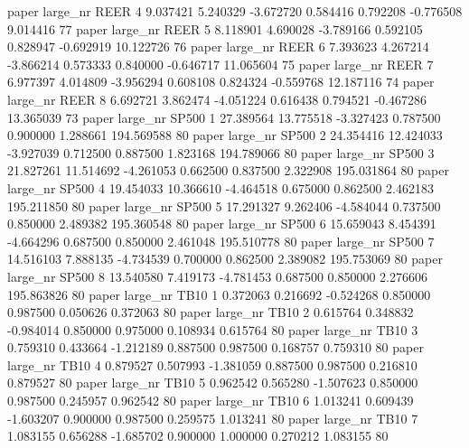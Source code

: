               paper   large_nr     REER                 4  9.037421  5.240329  -3.672720 0.584416 0.792208 -0.776508    9.014416 77
              paper   large_nr     REER                 5  8.118901  4.690028  -3.789166 0.592105 0.828947 -0.692919   10.122726 76
              paper   large_nr     REER                 6  7.393623  4.267214  -3.866214 0.573333 0.840000 -0.646717   11.065604 75
              paper   large_nr     REER                 7  6.977397  4.014809  -3.956294 0.608108 0.824324 -0.559768   12.187116 74
              paper   large_nr     REER                 8  6.692721  3.862474  -4.051224 0.616438 0.794521 -0.467286   13.365039 73
              paper   large_nr    SP500                 1 27.389564 13.775518  -3.327423 0.787500 0.900000  1.288661  194.569588 80
              paper   large_nr    SP500                 2 24.354416 12.424033  -3.927039 0.712500 0.887500  1.823168  194.789066 80
              paper   large_nr    SP500                 3 21.827261 11.514692  -4.261053 0.662500 0.837500  2.322908  195.031864 80
              paper   large_nr    SP500                 4 19.454033 10.366610  -4.464518 0.675000 0.862500  2.462183  195.211850 80
              paper   large_nr    SP500                 5 17.291327  9.262406  -4.584044 0.737500 0.850000  2.489382  195.360548 80
              paper   large_nr    SP500                 6 15.659043  8.454391  -4.664296 0.687500 0.850000  2.461048  195.510778 80
              paper   large_nr    SP500                 7 14.516103  7.888135  -4.734539 0.700000 0.862500  2.389082  195.753069 80
              paper   large_nr    SP500                 8 13.540580  7.419173  -4.781453 0.687500 0.850000  2.276606  195.863826 80
              paper   large_nr     TB10                 1  0.372063  0.216692  -0.524268 0.850000 0.987500  0.050626    0.372063 80
              paper   large_nr     TB10                 2  0.615764  0.348832  -0.984014 0.850000 0.975000  0.108934    0.615764 80
              paper   large_nr     TB10                 3  0.759310  0.433664  -1.212189 0.887500 0.987500  0.168757    0.759310 80
              paper   large_nr     TB10                 4  0.879527  0.507993  -1.381059 0.887500 0.987500  0.216810    0.879527 80
              paper   large_nr     TB10                 5  0.962542  0.565280  -1.507623 0.850000 0.987500  0.245957    0.962542 80
              paper   large_nr     TB10                 6  1.013241  0.609439  -1.603207 0.900000 0.987500  0.259575    1.013241 80
              paper   large_nr     TB10                 7  1.083155  0.656288  -1.685702 0.900000 1.000000  0.270212    1.083155 80
